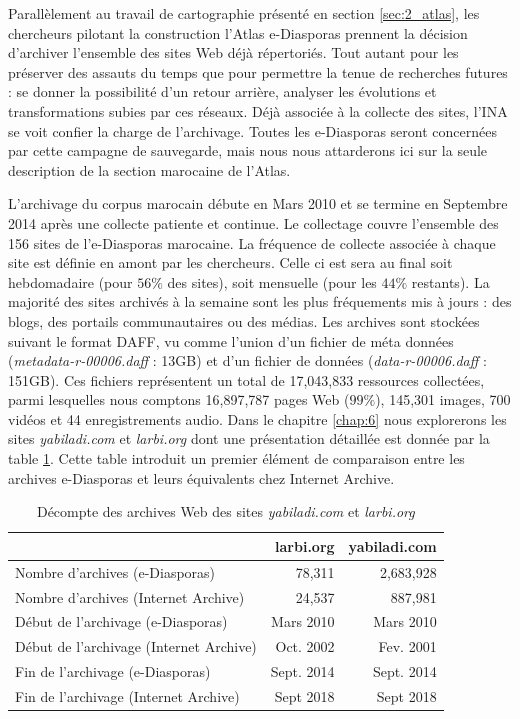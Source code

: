\documentclass[symmetric,justified,marginals=raggedouter]{tufte-book}
\begin{document}
\noindent Parallèlement au travail de cartographie présenté en section \ref{sec:2_atlas}, les chercheurs pilotant la construction l'Atlas e-Diasporas prennent la décision d'archiver l'ensemble des sites Web déjà répertoriés. Tout autant pour les préserver des assauts du temps \citep{khouzaimi_e-diasporas_2015} que pour permettre la tenue de recherches futures : se donner la possibilité d'un retour arrière, analyser les évolutions et transformations subies par ces réseaux. Déjà associée à la collecte des sites, l'INA se voit confier la charge de l'archivage. Toutes les e-Diasporas seront concernées par cette campagne de sauvegarde, mais  nous nous attarderons ici sur la seule description de la section marocaine de l'Atlas. 

L'archivage du corpus marocain débute en Mars 2010 et se termine en Septembre 2014 après une collecte patiente et continue. Le collectage couvre l'ensemble des 156 sites de l'e-Diasporas marocaine. La fréquence de collecte associée à chaque site est définie en amont par les chercheurs. Celle ci est sera au final soit hebdomadaire (pour $56\%$ des sites), soit mensuelle (pour les $44\%$ restants). La majorité des sites archivés à la semaine sont les plus fréquements mis à jours : des blogs, des portails communautaires ou des médias. Les archives sont stockées suivant le format DAFF, vu comme l'union d'un fichier de méta données (\textit{metadata-r-00006.daff} : 13GB) et d'un fichier de données (\textit{data-r-00006.daff} : 151GB). Ces fichiers représentent un total de 17,043,833 ressources collectées, parmi lesquelles nous comptons 16,897,787 pages Web ($99\%$), 145,301 images, 700 vidéos et 44 enregistrements audio. Dans le chapitre \ref{chap:6} nous explorerons les sites \textit{yabiladi.com} et \textit{larbi.org} dont une présentation détaillée est donnée par la table \ref{tab:detail-archive}. Cette table introduit un premier élément de comparaison entre les archives e-Diasporas et leurs équivalents chez Internet Archive.

\begin{table}
  \label{tab:detail-archive}
  \begin{tabular}{lrr}
    \toprule
    &larbi.org&yabiladi.com\\
    \midrule
    Nombre d'archives (e-Diasporas)  & 78,311 & 2,683,928\\
    Nombre d'archives (Internet Archive) & 24,537 & 887,981\\
    \midrule
    Début de l'archivage  (e-Diasporas) & Mars 2010 & Mars 2010\\
    Début de l'archivage  (Internet Archive) & Oct. 2002 & Fev. 2001\\
    \midrule
    Fin de l'archivage  (e-Diasporas) & Sept. 2014 & Sept. 2014\\
    Fin de l'archivage  (Internet Archive) & Sept 2018 & Sept 2018\\    
  \bottomrule
\end{tabular}
  \bigskip
  \caption{Décompte des archives Web des sites \textit{yabiladi.com} et \textit{larbi.org}}
\end{table} 
\end{document}
